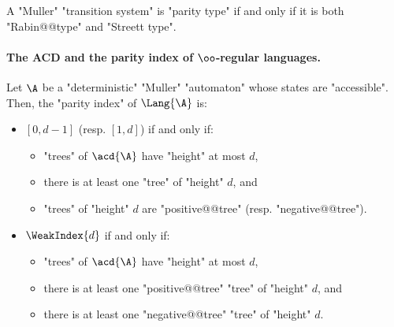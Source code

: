 \documentclass[10pt,a4paper]{amsart}
\begin{document}
\begin{corollary}\label{cor-cor:parityTS-iff-RabinAndStreettTS}
	A "Muller" "transition system" is "parity type" if and only if it is both "Rabin@@type" and "Streett type". 
\end{corollary}


\paragraph*{The ACD and the parity index of $\oo$-regular languages.}
\begin{proposition}\label{prop-typ:parity index-Muller-automaton}
	Let $\A$ be a "deterministic" "Muller" "automaton" whose states are "accessible". Then, the "parity index" of $\Lang{\A}$ is:
	\begin{itemize}
		\item $[0,d-1]$ (resp. $[1,d]$) if and only if:
		\begin{itemize}
			\item "trees" of $\acd{\A}$ have "height" at most $d$, 
			\item there is at least one "tree" of "height" $d$, and
			\item "trees" of "height" $d$ are "positive@@tree" (resp. "negative@@tree").
		\end{itemize} 
		\item $\WeakIndex{d}$ if and only if: 
		\begin{itemize}
			\item "trees" of $\acd{\A}$ have "height" at most $d$, 
			\item there is at least one "positive@@tree" "tree" of "height" $d$, and
			\item there is at least one "negative@@tree" "tree" of "height" $d$.
		\end{itemize} 
	\end{itemize}
\end{proposition}
\end{document}
